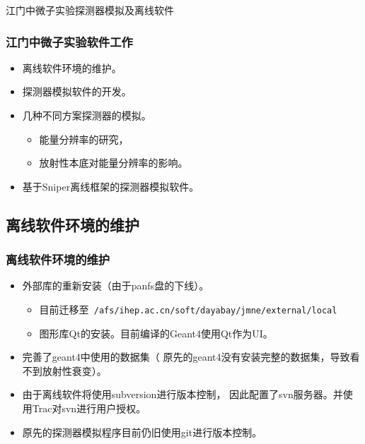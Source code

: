 
\begin{frame}
    \begin{center}
        \LARGE 江门中微子实验探测器模拟及离线软件
    \end{center}
\end{frame}

\begin{frame}
    \frametitle{江门中微子实验软件工作}
    \begin{itemize}
        \item 离线软件环境的维护。
        \item 探测器模拟软件的开发。
        \item 几种不同方案探测器的模拟。
            \begin{itemize}
                \item 能量分辨率的研究，
                \item 放射性本底对能量分辨率的影响。
            \end{itemize}
        \item 基于Sniper离线框架的探测器模拟软件。
    \end{itemize}
\end{frame}

\subsection{离线软件环境的维护}

\begin{frame}
    \frametitle{离线软件环境的维护}
    \begin{itemize}
        \item 外部库的重新安装（由于panfs盘的下线）。
            \begin{itemize}
                \item 目前迁移至{\tt
                    /afs/ihep.ac.cn/soft/dayabay/jmne/external/local}
                \item 图形库Qt的安装。目前编译的Geant4使用Qt作为UI。
            \end{itemize}
        \item 完善了geant4中使用的数据集（
              原先的geant4没有安装完整的数据集，导致看不到放射性衰变）。
        \item 由于离线软件将使用subversion进行版本控制，
              因此配置了svn服务器。并使用Trac对svn进行用户授权。
        \item 原先的探测器模拟程序目前仍旧使用git进行版本控制。
    \end{itemize}
\end{frame}

